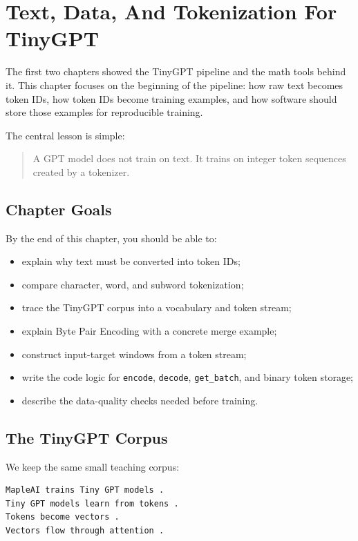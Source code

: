 \chapter{Text, Data, And Tokenization For TinyGPT}

The first two chapters showed the TinyGPT pipeline and the math tools behind it. This chapter focuses on the beginning of the pipeline: how raw text becomes token IDs, how token IDs become training examples, and how software should store those examples for reproducible training.

The central lesson is simple:

\begin{quote}
A GPT model does not train on text. It trains on integer token sequences created by a tokenizer.
\end{quote}

\section{Chapter Goals}

By the end of this chapter, you should be able to:

\begin{itemize}
  \item explain why text must be converted into token IDs;
  \item compare character, word, and subword tokenization;
  \item trace the TinyGPT corpus into a vocabulary and token stream;
  \item explain Byte Pair Encoding with a concrete merge example;
  \item construct input-target windows from a token stream;
  \item write the code logic for \texttt{encode}, \texttt{decode}, \texttt{get\_batch}, and binary token storage;
  \item describe the data-quality checks needed before training.
\end{itemize}

\section{The TinyGPT Corpus}

We keep the same small teaching corpus:

\begin{lstlisting}
MapleAI trains Tiny GPT models .
Tiny GPT models learn from tokens .
Tokens become vectors .
Vectors flow through attention .
\end{lstlisting}

